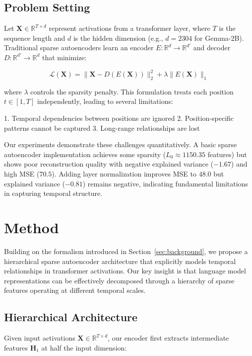 \documentclass{article} %
\begin{document}
\subsection{Problem Setting}
Let $\mathbf{X} \in \mathbb{R}^{T \times d}$ represent activations from a transformer layer, where $T$ is the sequence length and $d$ is the hidden dimension (e.g., $d=2304$ for Gemma-2B). Traditional sparse autoencoders learn an encoder $E: \mathbb{R}^d \rightarrow \mathbb{R}^{d'}$ and decoder $D: \mathbb{R}^{d'} \rightarrow \mathbb{R}^d$ that minimize:

\begin{equation}
    \mathcal{L}(\mathbf{X}) = \|\mathbf{X} - D(E(\mathbf{X}))\|_2^2 + \lambda\|E(\mathbf{X})\|_1
\end{equation}

where $\lambda$ controls the sparsity penalty. This formulation treats each position $t \in [1,T]$ independently, leading to several limitations:

1. Temporal dependencies between positions are ignored
2. Position-specific patterns cannot be captured
3. Long-range relationships are lost

Our experiments demonstrate these challenges quantitatively. A basic sparse autoencoder implementation achieves some sparsity ($L_0 \approx 1150.35$ features) but shows poor reconstruction quality with negative explained variance ($-1.67$) and high MSE ($70.5$). Adding layer normalization improves MSE to $48.0$ but explained variance ($-0.81$) remains negative, indicating fundamental limitations in capturing temporal structure.

\section{Method}
\label{sec:method}

Building on the formalism introduced in Section~\ref{sec:background}, we propose a hierarchical sparse autoencoder architecture that explicitly models temporal relationships in transformer activations. Our key insight is that language model representations can be effectively decomposed through a hierarchy of sparse features operating at different temporal scales.

\subsection{Hierarchical Architecture}
Given input activations $\mathbf{X} \in \mathbb{R}^{T \times d}$, our encoder first extracts intermediate features $\mathbf{H}_1$ at half the input dimension:
\end{document}
